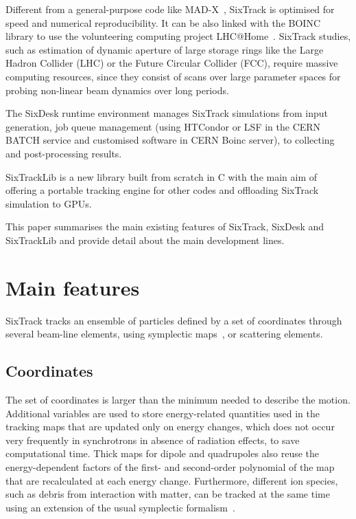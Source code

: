 \documentclass[a4paper,
              ]{jacow}
\begin{document}
Different from a general-purpose code like MAD-X~\cite{madx, madxICAP18}, SixTrack is optimised for speed and numerical reproducibility. It can be also linked with the BOINC library to use the volunteering computing project LHC@Home~\cite{lhcathome}.
SixTrack studies, such as estimation of dynamic aperture of large storage rings like the Large Hadron Collider (LHC) or the Future Circular Collider (FCC), require massive computing resources, since they consist of scans over large parameter spaces for probing non-linear beam dynamics over long periods.

The SixDesk runtime environment manages SixTrack simulations from input generation, job queue management (using HTCondor or LSF in the CERN BATCH service and customised software in CERN Boinc server), to collecting and post-processing results.  

SixTrackLib is a new library built from scratch in C with the main aim of offering a portable tracking engine for other codes and offloading SixTrack simulation to GPUs.

This paper summarises the main existing features of SixTrack, SixDesk and SixTrackLib and provide detail about the main development lines.

\section{Main features}

SixTrack tracks an ensemble of particles defined by a set of coordinates through several beam-line elements, using symplectic maps~\cite{ripken95, heinemann95, barber87}, or scattering elements.

\subsection{Coordinates}
The set of coordinates is larger than the minimum needed to describe the motion. Additional variables are used to store energy-related quantities used in the tracking maps that are updated only on energy changes, which does not occur very frequently in synchrotrons in absence of radiation effects, to save computational time. Thick maps for dipole and quadrupoles also reuse the energy-dependent factors of the first- and second-order polynomial of the map that are recalculated at each energy change. Furthermore, different ion species, such as debris from interaction with matter, can be tracked at the same time using an extension of the usual symplectic formalism~\cite{ions}.
\end{document}
